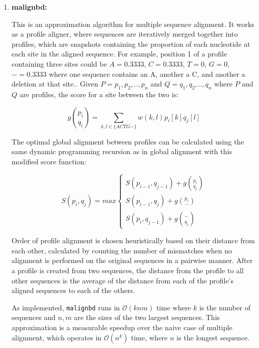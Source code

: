 \documentclass[11pt]{article}
\newcommand{\prog}[1]{\texttt{#1}}
\begin{document}
\begin{enumerate}
\item{\bf{malignbd}:}

This is an approximation algorithm for multiple sequence alignment. It works
as a profile aligner, where sequences are iteratively merged together into
profiles, which are snapshots containing the proportion of each nucleotide
at each site in the aligned sequence. For example, position 1 of a profile
containing three sites could be $A=0.3333$, $C=0.3333$, $T=0$, $G=0$,
$-=0.3333$ where one sequence contains an A, another a C, and another a
deletion at that site.. Given $P=p_1,p_2,..,p_n$ and $Q=q_1,q_2,..,q_n$ 
where $P$ and $Q$ are profiles, the score for a site between the two is:

\begin{displaymath}
g{p_i\choose q_i} = \sum\limits_{k,l\in\{ACTG-\}}w(k,l) p_i[k] q_j[l]
\end{displaymath}

The optimal global alignment between profiles can be calculated using the
same dynamic programming recursion as in global alignment with this modified
score function:

\begin{displaymath}
S(p_i,q_j) = max\left\{
  \begin{array}{lr}
    S(p_{i-1},q_{j-1}) + g{p_i\choose q_j}\\
    S(p_{i-1},q_j) + g{p_i\choose -} \\
    S(p_i,q_{j-1}) + g{-\choose q_j}
    \end{array}
    \right.
\end{displaymath}

Order of profile alignment is chosen heuristically based on their distance
from each other, calculated by counting the number of mismatches when no
alignment is performed on the original sequences in a pairwise manner. After
a profile is created from two sequences, the distance from the profile to
all other sequences is the average of the distance from each of the profile's
aligned sequences to each of the others.

As implemented, \prog{malignbd} runs in $\mathcal{O}(knm)$ time where $k$ is
the number of sequences and $n,m$ are the sizes of the two largest sequences.
This approximation is a measurable speedup over the naive case of multiple
alignment, which operates in  $\mathcal{O}(n^k)$ time, where $n$ is the 
longest sequence.

\end{enumerate}
\end{document}
